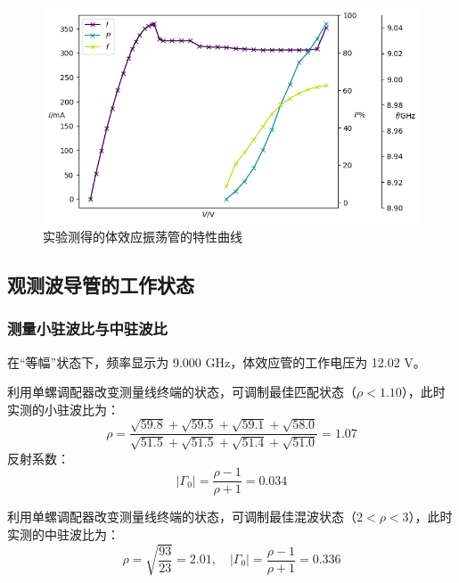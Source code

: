 \documentclass[aps,pre,12pt,preprint,onecolumn,showpacs,showkeys]{revtex4-1}
\begin{document}
    \begin{figure}[ht]
        \centering
        \includegraphics[width=120mm]{feature_curve}
        \caption{\label{fig:feature_curve}%
        实验测得的体效应振荡管的特性曲线}
    \end{figure}

    \subsection{观测波导管的工作状态}
        \subsubsection{测量小驻波比与中驻波比}
        在“等幅”状态下，频率显示为 9.000 GHz，体效应管的工作电压为 12.02 V。
        
        利用单螺调配器改变测量线终端的状态，可调制最佳匹配状态（$\rho<1.10$），此时实测的小驻波比为：
        \begin{equation}
            \rho=\frac{\sqrt{59.8}+\sqrt{59.5}+\sqrt{59.1}+\sqrt{58.0}}{\sqrt{51.5}+\sqrt{51.5}+\sqrt{51.4}+\sqrt{51.0}}=1.07
        \end{equation}
        反射系数：
        \begin{equation}
            |\Gamma_0|=\frac{\rho-1}{\rho+1}=0.034
        \end{equation}

        利用单螺调配器改变测量线终端的状态，可调制最佳混波状态（$2<\rho<3$），此时实测的中驻波比为：
        \begin{equation}
            \rho=\sqrt{\frac{93}{23}}=2.01,\quad |\Gamma_0|=\frac{\rho-1}{\rho+1}=0.336
        \end{equation}
    
\end{document}

